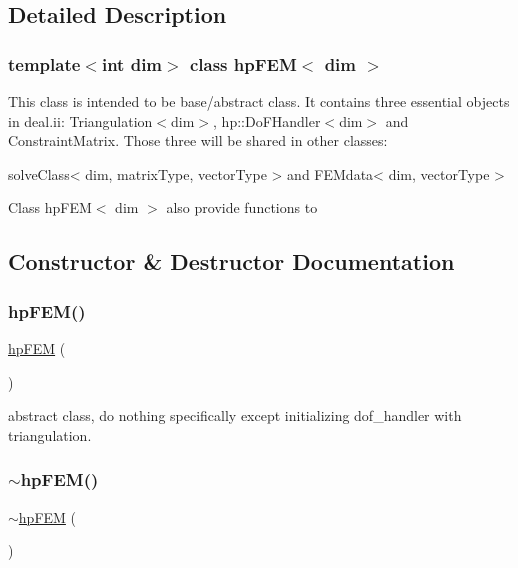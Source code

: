 \subsection{Detailed Description}
\subsubsection*{template$<$int dim$>$\newline
class hp\+F\+E\+M$<$ dim $>$}

This class is intended to be base/abstract class. It contains three essential objects in deal.\+ii\+: {\ttfamily Triangulation$<$dim$>$}, {\ttfamily hp\+::\+Do\+F\+Handler$<$dim$>$} and {\ttfamily Constraint\+Matrix}. Those three will be shared in other classes\+:
\begin{DoxyCode}
solveClass< dim, matrixType, vectorType > and FEMdata< dim, vectorType >
\end{DoxyCode}
 Class hp\+F\+E\+M$<$ dim $>$ also provide functions to 

\subsection{Constructor \& Destructor Documentation}
\mbox{\label{classhp_f_e_m_ac1540fdd371c0b89a90809251b618025}} 
\subsubsection{\texorpdfstring{hp\+F\+E\+M()}{hpFEM()}}
{\footnotesize\ttfamily \mbox{\hyperlink{classhp_f_e_m}{hp\+F\+EM}} (\begin{DoxyParamCaption}{ }\end{DoxyParamCaption})}

abstract class, do nothing specifically except initializing dof\+\_\+handler with triangulation. \mbox{\label{classhp_f_e_m_acf426058508649734ee9618b5c9148c1}} 
\subsubsection{\texorpdfstring{$\sim$hp\+F\+E\+M()}{~hpFEM()}}
{\footnotesize\ttfamily $\sim$\mbox{\hyperlink{classhp_f_e_m}{hp\+F\+EM}} (\begin{DoxyParamCaption}{ }\end{DoxyParamCaption})}



